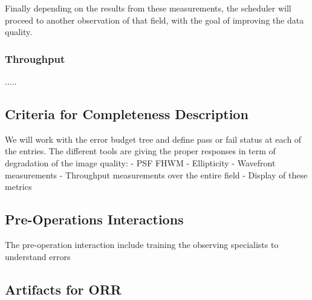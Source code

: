 Finally depending on the results from these measurements, the scheduler will proceed to another observation of that field, with the goal of improving the data quality. 

\subsubsection{Throughput}

.....

\subsection{Criteria for Completeness Description}

We will work with the error budget tree and define pass or fail status at each of the entries. 
The different tools are giving the proper responses in term of degradation of the image quality: 
- PSF FHWM
- Ellipticity
- Wavefront measurements
- Throughput measurements over the entire field
 - Display of these metrics 

\subsection{Pre-Operations Interactions}
The pre-operation interaction include training the observing specialists to understand errors 


\subsection{Artifacts for ORR}






